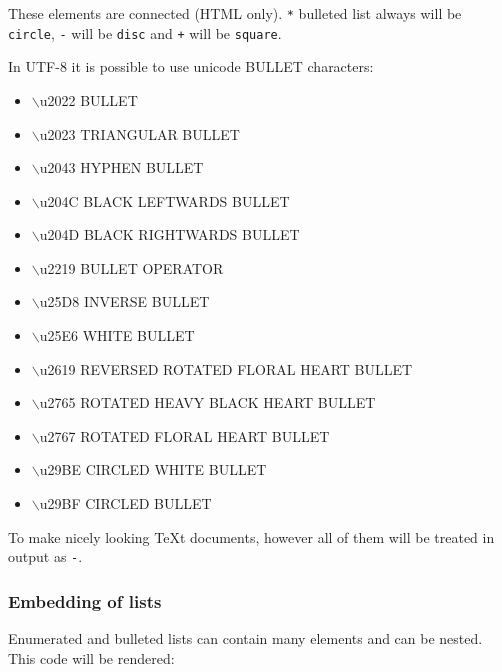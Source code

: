 \documentclass[12pt]{article}
\begin{document}
These elements are connected (HTML only). \texttt{*} bulleted list always will be
\texttt{circle}, \texttt{-} will be \texttt{disc} and \texttt{+} will be \texttt{square}.

In UTF-8 it is possible to use unicode BULLET characters:

\begin{itemize}
\item
$\backslash$u2022 BULLET

\item
$\backslash$u2023 TRIANGULAR BULLET

\item
$\backslash$u2043 HYPHEN BULLET

\item
$\backslash$u204C BLACK LEFTWARDS BULLET

\item
$\backslash$u204D BLACK RIGHTWARDS BULLET

\item
$\backslash$u2219 BULLET OPERATOR

\item
$\backslash$u25D8 INVERSE BULLET

\item
$\backslash$u25E6 WHITE BULLET

\item
$\backslash$u2619 REVERSED ROTATED FLORAL HEART BULLET

\item
$\backslash$u2765 ROTATED HEAVY BLACK HEART BULLET

\item
$\backslash$u2767 ROTATED FLORAL HEART BULLET

\item
$\backslash$u29BE CIRCLED WHITE BULLET

\item
$\backslash$u29BF CIRCLED BULLET
\end{itemize}

To make nicely looking \TeX{}t documents, however all of them will be treated in
output as \texttt{-}.

\hypertarget{lembedding-of-lists}{}
\subsubsection{Embedding of lists}

Enumerated and bulleted lists can contain many elements and can be
nested. This code will be rendered:
\end{document}
